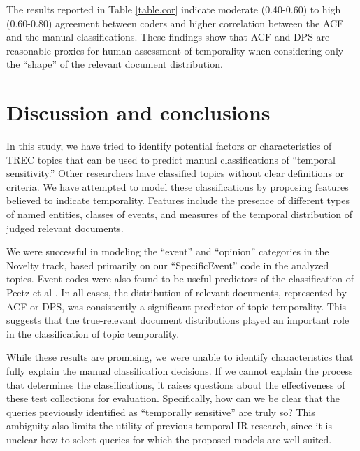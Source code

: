 \documentclass{sig-alternate}
\begin{document}
The results reported in Table \ref{table.cor} indicate moderate (0.40-0.60) to high (0.60-0.80) agreement between coders and higher correlation between the ACF and the manual classifications. These findings show that ACF and DPS are reasonable proxies for human assessment of temporality when considering only the ``shape'' of the relevant document distribution.



\section{Discussion and conclusions}

In this study, we have tried to identify potential factors or characteristics of TREC topics that can be used to predict manual classifications of ``temporal sensitivity.'' Other researchers have classified topics without clear definitions or criteria. We have attempted to model these classifications by proposing features believed to indicate temporality.  Features include the presence of different types of named entities, classes of events, and measures of the temporal distribution of judged relevant documents.

We were successful in modeling the ``event'' and ``opinion'' categories in the Novelty track, based primarily on our ``SpecificEvent'' code in the analyzed topics.  Event codes were also found to be useful predictors of the classification of Peetz et al \cite{Peetz2013a}. In all cases, the distribution of relevant documents, represented by ACF or DPS, was consistently a significant predictor of topic temporality. This suggests that the true-relevant document distributions played an important role in the classification of topic temporality.

While these results are promising, we were unable to identify characteristics that fully explain the manual classification decisions. If we cannot explain the process that determines the classifications, it raises questions about the effectiveness of these test collections for evaluation. Specifically, how can we be clear that the queries previously identified as ``temporally sensitive'' are truly so? This ambiguity also limits the utility of previous temporal IR research, since it is unclear how to select queries for which the proposed models are well-suited.
\end{document}
